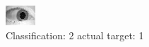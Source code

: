 \begin{figure}[h!]
\begin{center}
\includegraphics[width=0.60\columnwidth]{figures/ID1574_class_2_target_1.png}
\end{center}
\caption{ Classification: 2 actual target: 1}
\label{fig:ID1574_class_2_target_1}
\end{figure}
